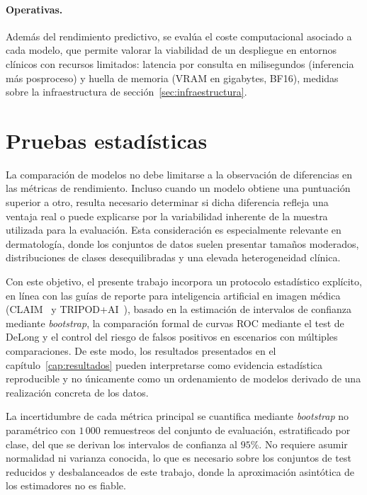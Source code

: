 \paragraph{Operativas.}
Además del rendimiento predictivo, se evalúa el coste computacional
asociado a cada modelo, que permite valorar la viabilidad de un
despliegue en entornos clínicos con recursos limitados: latencia por
consulta en milisegundos (inferencia más posproceso) y huella de
memoria (VRAM en gigabytes, BF16), medidas sobre la infraestructura
de sección~\ref{sec:infraestructura}.

\section{Pruebas estadísticas}
\label{sec:estadistica}

La comparación de modelos no debe limitarse a la observación de
diferencias en las métricas de rendimiento. Incluso cuando un modelo
obtiene una puntuación superior a otro, resulta necesario determinar
si dicha diferencia refleja una ventaja real o puede explicarse por
la variabilidad inherente de la muestra utilizada para la
evaluación. Esta consideración es especialmente relevante en
dermatología, donde los conjuntos de datos suelen presentar tamaños
moderados, distribuciones de clases desequilibradas y una elevada
heterogeneidad clínica.

Con este objetivo, el presente trabajo incorpora un protocolo
estadístico explícito, en línea con las guías de reporte para
inteligencia artificial en imagen médica (CLAIM~\cite{claim2024} y
TRIPOD+AI~\cite{tripodai2024}), basado en la estimación de
intervalos de confianza mediante \emph{bootstrap}, la comparación
formal de curvas ROC mediante el test de DeLong y el control del
riesgo de falsos positivos en escenarios con múltiples
comparaciones. De este modo, los resultados presentados en el
capítulo~\ref{cap:resultados} pueden interpretarse como evidencia
estadística reproducible y no únicamente como un ordenamiento de
modelos derivado de una realización concreta de los datos.

La incertidumbre de cada métrica principal se cuantifica mediante
\emph{bootstrap} no paramétrico con $1\,000$ remuestreos del
conjunto de evaluación, estratificado por clase, del que se derivan
los intervalos de confianza al $95\%$. No requiere asumir
normalidad ni varianza conocida, lo que es necesario sobre los
conjuntos de test reducidos y desbalanceados de este trabajo, donde
la aproximación asintótica de los estimadores no es fiable.

